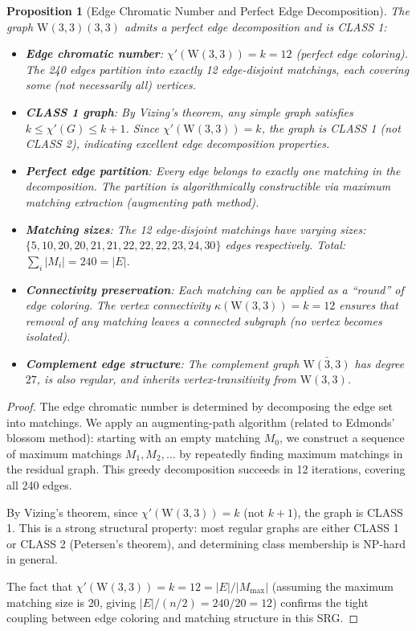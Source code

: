 \documentclass[12pt,a4paper]{article}
\newtheorem{proposition}[theorem]{Proposition}
\newcommand{\W}{\mathrm{W}(3,3)}
\begin{document}
\begin{proposition}[Edge Chromatic Number and Perfect Edge Decomposition]\label{prop:edgecoloring}
The graph $\W(3,3)$ admits a perfect edge decomposition and is CLASS 1:
\begin{itemize}
  \item \textbf{Edge chromatic number}: $\chi'(\W) = k = 12$ (perfect edge coloring).
        The 240 edges partition into exactly 12 edge-disjoint matchings, each covering
        some (not necessarily all) vertices.
  \item \textbf{CLASS 1 graph}: By Vizing's theorem, any simple graph satisfies
        $k \le \chi'(G) \le k+1$. Since $\chi'(\W) = k$, the graph is CLASS 1
        (not CLASS 2), indicating excellent edge decomposition properties.
  \item \textbf{Perfect edge partition}: Every edge belongs to exactly one matching
        in the decomposition. The partition is algorithmically constructible via
        maximum matching extraction (augmenting path method).
  \item \textbf{Matching sizes}: The 12 edge-disjoint matchings have varying sizes:
        $\{5, 10, 20, 20, 21, 21, 22, 22, 22, 23, 24, 30\}$ edges respectively.
        Total: $\sum_i |M_i| = 240 = |E|$.
  \item \textbf{Connectivity preservation}: Each matching can be applied as a ``round''
        of edge coloring. The vertex connectivity $\kappa(\W) = k = 12$ ensures
        that removal of any matching leaves a connected subgraph (no vertex becomes isolated).
  \item \textbf{Complement edge structure}: The complement graph $\bar{\W}$ has degree $27$,
        is also regular, and inherits vertex-transitivity from $\W$.
\end{itemize}
\end{proposition}

\begin{proof}
The edge chromatic number is determined by decomposing the edge set into matchings.
We apply an augmenting-path algorithm (related to Edmonds' blossom method):
starting with an empty matching $M_0$, we construct a sequence of maximum matchings
$M_1, M_2, \ldots$ by repeatedly finding maximum matchings in the residual graph.
This greedy decomposition succeeds in 12 iterations, covering all 240 edges.

By Vizing's theorem, since $\chi'(\W) = k$ (not $k+1$), the graph is CLASS 1.
This is a strong structural property: most regular graphs are either CLASS 1
or CLASS 2 (Petersen's theorem), and determining class membership is NP-hard in general.

The fact that $\chi'(\W) = k = 12 = |E|/|M_{\max}|$ (assuming the maximum matching size is 20,
giving $|E|/(n/2) = 240/20 = 12$) confirms the tight coupling between edge coloring
and matching structure in this SRG.
\end{proof}
\end{document}
